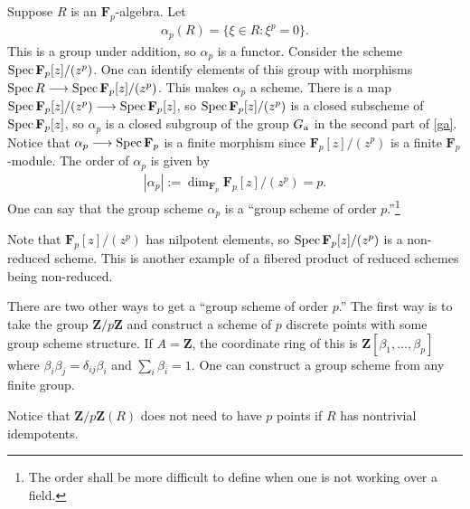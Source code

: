 \documentclass [11 pt, oneside] {article}
\begin{document}
\begin{example}[ ]\label{}\text{}
Suppose $R$ is an $\mathbf{F}_{p}$-algebra. Let 
\begin{align*}
	\alpha_p(R) = \{ \xi\in R : \xi^p =0\}.
\end{align*}
This is a group under addition, so $\alpha_p$ is a functor. Consider the scheme $\operatorname{Spec} \mathbf{F}_{p}[z]/(z^p)$. One can identify elements of this group with morphisms $\operatorname{Spec} R \longrightarrow \operatorname{Spec} \mathbf{F}_{p}[z]/(z^p)$. This makes $\alpha_p$ a scheme. There is a map $\operatorname{Spec} \mathbf{F}_{p}[z]/(z^p)\longrightarrow \operatorname{Spec} \mathbf{F}_{p}[z]$, so $\operatorname{Spec} \mathbf{F}_{p}[z]/(z^p)$ is a closed subscheme of $\operatorname{Spec} \mathbf{F}_{p}[z]$, so $\alpha_p$ is a closed subgroup of the group $G \textsubscript{a}$ in the second part of \cref{ga}. Notice that $\alpha_p \longrightarrow \operatorname{Spec} \mathbf{F}_{p}$ is a finite morphism since $\mathbf{F}_{p}[z]/(z^p)$ is a finite $\mathbf{F}_{p}$-module. The order of $\alpha_p$ is given by
\begin{align*}
	\left\lvert \alpha_p \right\rvert := \dim_{\mathbf{F}_{p}} \mathbf{F}_{p}[z]/(z^p) =p.
\end{align*}
One can say that the group scheme $\alpha_p$ is a ``group scheme of order $p$.''\footnote{The order shall be more difficult to define when one is not working over a field.}

Note that $\mathbf{F}_{p}[z]/(z^p)$ has nilpotent elements, so $\operatorname{Spec} \mathbf{F}_{p}[z]/(z^p)$ is a non-reduced scheme. This is another example of a fibered product of reduced schemes being non-reduced.
\end{example}

There are two other ways to get a ``group scheme of order $p$.'' The first way is to take the group $\mathbf{Z}/p\mathbf{Z}$ and construct a scheme of $p$ discrete points with some group scheme structure. If $A=\mathbf{Z}$, the coordinate ring of this is $\mathbf{Z}[\beta_1,\hdots, \beta_p]$ where $\beta_{i}\beta_j =\delta_{ij}\beta_i $ and $\sum_{i}^{} \beta_i=1$. One can construct a group scheme from any finite group.

\begin{remark}
	Notice that $\mathbf{Z}/p\mathbf{Z}(R)$ does not need to have $p$ points if $R$ has nontrivial idempotents.
\end{remark}
\end{document}
